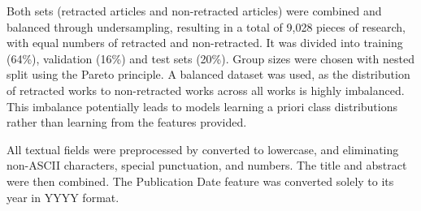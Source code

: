 \documentclass[pdflatex,sn-mathphys-num]{sn-jnl}%
\begin{document}
Both sets (retracted articles and non-retracted articles) were combined and balanced through undersampling, resulting in a total of 9,028 pieces of research, with equal numbers of retracted and non-retracted. It was divided into training (64\%), validation (16\%) and test sets (20\%). Group sizes were chosen with nested split using the Pareto principle.  A balanced dataset was used, as the distribution of retracted works to non-retracted works across all works is highly imbalanced. This imbalance potentially leads to models learning a priori class distributions rather than learning from the features provided. 

All textual fields were preprocessed by converted to lowercase, and eliminating non-ASCII characters, special punctuation, and numbers. The title and abstract were then combined. The Publication Date feature was converted solely to its year in YYYY format.






\end{document}

